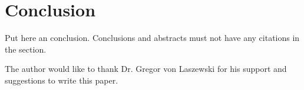 \documentclass[sigconf]{acmart}
\begin{document}
\section{Conclusion}

Put here an conclusion. Conclusions and abstracts must not have any
citations in the section.


\begin{acks}

  The author would like to thank Dr. Gregor von Laszewski for his
  support and suggestions to write this paper.

\end{acks}


 

\appendix
\end{document}
